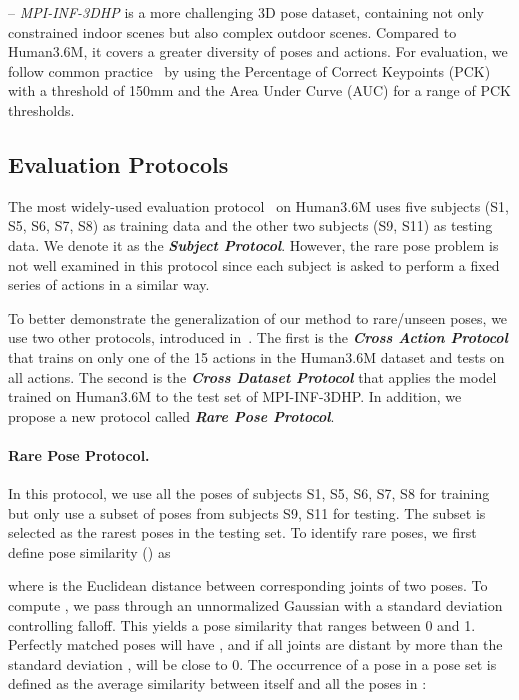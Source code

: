 \documentclass[runningheads]{llncs}
\begin{document}
\noindent -- \emph{MPI-INF-3DHP} \cite{mehta2017monocular,mehta2017vnect} is a more challenging 3D pose dataset, containing not only constrained indoor scenes but also complex outdoor scenes. Compared to Human3.6M, it covers a greater diversity of poses and actions. For evaluation, we follow common practice~\cite{wandt2019repnet,ci2019optimizing,wang2019generalizing,yang20183d} by using the Percentage of Correct Keypoints (PCK) with a threshold of 150mm and the Area Under Curve (AUC) for a range of PCK thresholds. 









\subsection{Evaluation Protocols}
\label{eval_set}
The most widely-used evaluation protocol~\cite{martinez2017simple,wang2019generalizing,huang2019deepfuse,pavllo20193d,ci2019optimizing} on Human3.6M uses five subjects (S1, S5, S6, S7, S8) as training data and the other two subjects (S9, S11) as testing data. We denote it as the \emph{\textbf{Subject Protocol}}. However, the rare pose problem is not well examined in this protocol since each subject is asked to perform a fixed series of actions in a similar way. 




To better demonstrate the generalization of our method to rare/unseen poses, we use two other protocols, introduced in~\cite{ci2019optimizing}. The first is the \emph{\textbf{Cross Action Protocol}} that trains on only one of the 15 actions in the Human3.6M dataset and tests on all actions. The second is the \emph{\textbf{Cross Dataset Protocol}} that applies the model trained on Human3.6M to the test set of MPI-INF-3DHP. In addition, we propose a new protocol called \emph{\textbf{Rare Pose Protocol}}. 
\paragraph{\textbf{Rare Pose Protocol}.} In this protocol, we use all the poses of subjects S1, S5, S6, S7, S8 for training but only use a subset of poses from subjects S9, S11 for testing. The subset is selected as the rarest poses in the testing set.
To identify rare poses, we first define pose similarity () as

where  is the Euclidean distance between corresponding joints of two poses. To compute , we pass  through an unnormalized Gaussian with a standard deviation  controlling falloff. This yields a pose similarity that ranges between 0 and 1. Perfectly matched poses will have , and if all joints are distant by more than the standard deviation ,  will be close to 0. The occurrence of a pose  in a pose set  is defined as the average similarity between itself and all the poses in :
\end{document}
